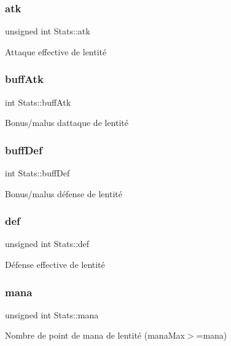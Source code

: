 \subsubsection{\texorpdfstring{atk}{atk}}
{\footnotesize\ttfamily unsigned int Stats\+::atk}

Attaque effective de l\textquotesingle{}entité \mbox{\label{structStats_a5e823290d5a71ec78c6fc1ae777f96a6}} 
\subsubsection{\texorpdfstring{buff\+Atk}{buffAtk}}
{\footnotesize\ttfamily int Stats\+::buff\+Atk}

Bonus/malus d\textquotesingle{}attaque de l\textquotesingle{}entité \mbox{\label{structStats_afbd2cc1240efa91f1a0577576c7c1699}} 
\subsubsection{\texorpdfstring{buff\+Def}{buffDef}}
{\footnotesize\ttfamily int Stats\+::buff\+Def}

Bonus/malus défense de l\textquotesingle{}entité \mbox{\label{structStats_a87c330097a4b5399d1c2f00826299fc1}} 
\subsubsection{\texorpdfstring{def}{def}}
{\footnotesize\ttfamily unsigned int Stats\+::def}

Défense effective de l\textquotesingle{}entité \mbox{\label{structStats_abc64c659cb31cc29124bd55bd089d385}} 
\subsubsection{\texorpdfstring{mana}{mana}}
{\footnotesize\ttfamily unsigned int Stats\+::mana}

Nombre de point de mana de l\textquotesingle{}entité (mana\+Max$>$=mana) \mbox{\label{structStats_a8df4032690c2c14ec4669c997baa7624}} 

